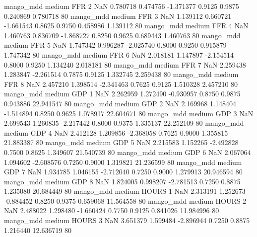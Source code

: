         mango_mdd     medium      FFR                 2                  NaN  0.780718 0.474756 -1.371377 0.9125 0.9875  0.240869    0.780718 80
        mango_mdd     medium      FFR                 3                  NaN  1.139112 0.660721 -1.661543 0.8625 0.9750  0.458986    1.139112 80
        mango_mdd     medium      FFR                 4                  NaN  1.460763 0.836709 -1.868727 0.8250 0.9625  0.689443    1.460763 80
        mango_mdd     medium      FFR                 5                  NaN  1.747342 0.996287 -2.025740 0.8000 0.9250  0.915879    1.747342 80
        mango_mdd     medium      FFR                 6                  NaN  2.018181 1.147897 -2.154514 0.8000 0.9250  1.134240    2.018181 80
        mango_mdd     medium      FFR                 7                  NaN  2.259438 1.283847 -2.261514 0.7875 0.9125  1.332745    2.259438 80
        mango_mdd     medium      FFR                 8                  NaN  2.457210 1.398514 -2.341463 0.7625 0.9125  1.510328    2.457210 80
        mango_mdd     medium      GDP                 1                  NaN  2.262959 1.272490 -0.930957 0.8750 0.9875  0.943886   22.941547 80
        mango_mdd     medium      GDP                 2                  NaN  2.169968 1.148404 -1.514894 0.8250 0.9625  1.078917   22.604671 80
        mango_mdd     medium      GDP                 3                  NaN  2.699543 1.260835 -2.217442 0.8000 0.9375  1.335137   22.252109 80
        mango_mdd     medium      GDP                 4                  NaN  2.412128 1.209856 -2.368058 0.7625 0.9000  1.355815   21.883387 80
        mango_mdd     medium      GDP                 5                  NaN  2.215583 1.152265 -2.492828 0.7500 0.8625  1.349607   21.540739 80
        mango_mdd     medium      GDP                 6                  NaN  2.067064 1.094602 -2.608576 0.7250 0.9000  1.319821   21.236599 80
        mango_mdd     medium      GDP                 7                  NaN  1.934785 1.046155 -2.712040 0.7250 0.9000  1.279913   20.946594 80
        mango_mdd     medium      GDP                 8                  NaN  1.824005 0.998207 -2.781513 0.7250 0.8875  1.235080   20.684449 80
        mango_mdd     medium    HOURS                 1                  NaN  2.313191 1.252673 -0.884452 0.8250 0.9375  0.659068   11.564558 80
        mango_mdd     medium    HOURS                 2                  NaN  2.488022 1.298480 -1.660424 0.7750 0.9125  0.841026   11.984996 80
        mango_mdd     medium    HOURS                 3                  NaN  3.651379 1.599484 -2.896944 0.7250 0.8875  1.216440   12.636719 80
